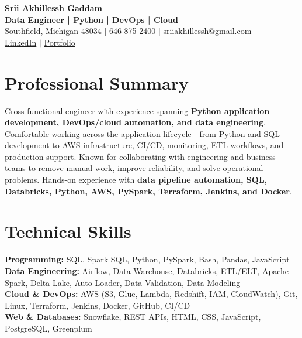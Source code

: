\documentclass[letterpaper,10pt]{article}
\begin{document}
\fontsize{9.35pt}{10.45pt}\selectfont

\begin{center}
    {\LARGE \textbf{Srii Akhillessh Gaddam}} \\[-1pt]
    \textbf{Data Engineer | Python | DevOps | Cloud} \\[2pt]
    Southfield, Michigan 48034 $|$
    \href{tel:6468752400}{646-875-2400} $|$
    \href{mailto:sriiakhillessh@gmail.com}{sriiakhillessh@gmail.com} \\[1pt]
    \href{https://www.linkedin.com/in/srii-akhiilessh-gaddam-b48668191/}{LinkedIn} $|$
    \href{https://sriiakhillesshg.github.io/portfolio/}{Portfolio}
\end{center}
\vspace{-8pt}

\section{Professional Summary}
\small{Cross-functional engineer with experience spanning \textbf{Python application development, DevOps/cloud automation, and data engineering}. Comfortable working across the application lifecycle - from Python and SQL development to AWS infrastructure, CI/CD, monitoring, ETL workflows, and production support. Known for collaborating with engineering and business teams to remove manual work, improve reliability, and solve operational problems. Hands-on experience with \textbf{data pipeline automation, SQL, Databricks, Python, AWS, PySpark, Terraform, Jenkins, and Docker}.}

\section{Technical Skills}
\small{
\textbf{Programming:} SQL, Spark SQL, Python, PySpark, Bash, Pandas, JavaScript \\
\textbf{Data Engineering:} Airflow, Data Warehouse, Databricks, ETL/ELT, Apache Spark, Delta Lake, Auto Loader, Data Validation, Data Modeling \\
\textbf{Cloud \& DevOps:} AWS (S3, Glue, Lambda, Redshift, IAM, CloudWatch), Git, Linux, Terraform, Jenkins, Docker, GitHub, CI/CD \\
\textbf{Web \& Databases:} Snowflake, REST APIs, HTML, CSS, JavaScript, PostgreSQL, Greenplum
}
\end{document}

